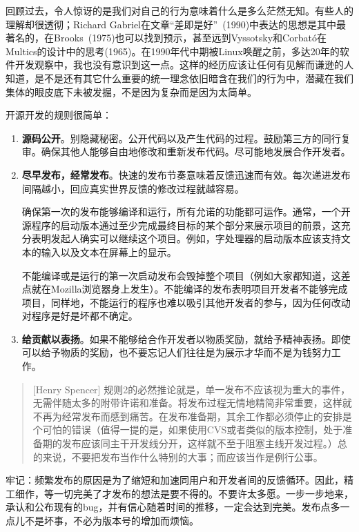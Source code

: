 \documentclass[12pt,oneside]{ctexbook}
\begin{document}
\begin{common-format}
回顾过去，令人惊讶的是我们对自己的行为意味着什么是多么茫然无知。有些人的理解却很透彻；Richard Gabriel在文章“差即是好”~\cite{Gabriel}(1990)中表达的思想是其中最著名的，在Brooks~\cite{Brooks}(1975\linebreak )也可以找到预示，甚至远到Vyssotsky和Corbató在Multics的设计中的思考(1965)。在1990年代中期被Linux唤醒之前，多达20年的软件开发观察中，我也没有意识到这一点。这样的经历应该让任何有见解而谦逊的人知道，是不是还有其它什么重要的统一理念依旧暗含在我们的行为中，潜藏在我们集体的眼皮底下未被发掘，不是因为复杂而是因为太简单。

开源开发的规则很简单：
\begin{enumerate}
\item \textbf{源码公开}。别隐藏秘密。公开代码以及产生代码的过程。鼓励第三方的同行复审。确保其他人能够自由地修改和重新发布代码。尽可能地发展合作开发者。
\item \textbf{尽早发布，经常发布}。快速的发布节奏意味着反馈迅速而有效。每次递进发布间隔越小，回应真实世界反馈的修改过程就越容易。

确保第一次的发布能够编译和运行，所有允诺的功能都可运作。通常，一个开源程序的启动版本通过至少完成最终目标的某个部分来展示项目的前景，这充分表明发起人确实可以继续这个项目。例如，字处理器的启动版本应该支持文本的输入以及文本在屏幕上的显示。

不能编译或是运行的第一次启动发布会毁掉整个项目（例如大家都知道，这差点就在Mozilla浏览器身上发生）。不能编译的发布表明项目开发者不能够完成项目，同样地，不能运行的程序也难以吸引其他开发者的参与，因为任何改动对程序是好是坏都不确定。

\item \textbf{给贡献以表扬}。如果不能够给合作开发者以物质奖励，就给予精神表扬。即使可以给予物质的奖励，也不要忘记人们往往是为展示才华而不是为钱努力工作。
\end{enumerate}

\begin{quote}[Henry Spencer]
规则2的必然推论就是，单一发布不应该视为重大的事件，无需伴随太多的附带许诺和准备。将发布过程无情地精简非常重要，这样就不再为经常发布而感到痛苦。在发布准备期，其余工作都必须停止的安排是个可怕的错误（值得一提的是，如果使用CVS或者类似的版本控制，处于准备期的发布应该同主干开发线分开，这样就不至于阻塞主线开发过程。）总的来说，不要把发布当作什么特别的大事；而应该当作是例行公事。
\end{quote}

牢记：频繁发布的原因是为了缩短和加速同用户和开发者间的反馈循环。因此，精工细作，等一切完美了才发布的想法是要不得的。不要许太多愿。一步一步地来，承认和公布现有的bug，并有信心随着时间的推移，一定会达到完美。发布点多一点儿不是坏事，不必为版本号的增加而烦恼。


\end{common-format}
\end{document}
